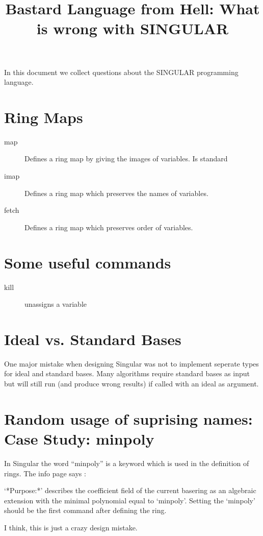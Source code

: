 \documentclass[a4paper]{article}
\title{Bastard Language from Hell: What is wrong with SINGULAR}
\begin{document}
\maketitle

In this document we collect questions about the SINGULAR programming
language. 

\section{Ring Maps}
\label{sec:ring-maps}

\begin{description}
\item[map] Defines a ring map by giving the images of
  variables. Is standard
\item[imap] Defines a ring map which preserves the names of variables.
\item[fetch] Defines a ring map which preserves order of variables.
\end{description}

\section{Some useful commands}
\label{sec:some-useful-commands}

\begin{description}
\item[kill] unassigns a variable
\end{description}

\section{Ideal vs. Standard Bases}
\label{sec:ideal-vs.-standard}

One major mistake when designing Singular was not to implement
seperate types for ideal and standard bases. Many algorithms require
standard bases as input but will still run (and produce wrong results)
if called with an ideal as argument. 

\section{Random usage of suprising names: Case Study: minpoly}
\label{sec:minpoly}
In Singular the word ``minpoly'' is a keyword which is used in the
definition of rings. The info page says :

`*Purpose:*'
     describes the coefficient field of the current basering as an
     algebraic extension with the minimal polynomial equal to `minpoly'.
     Setting the `minpoly' should be the first command after defining
     the ring.

I think, this is just a crazy design mistake.
\end{document}
